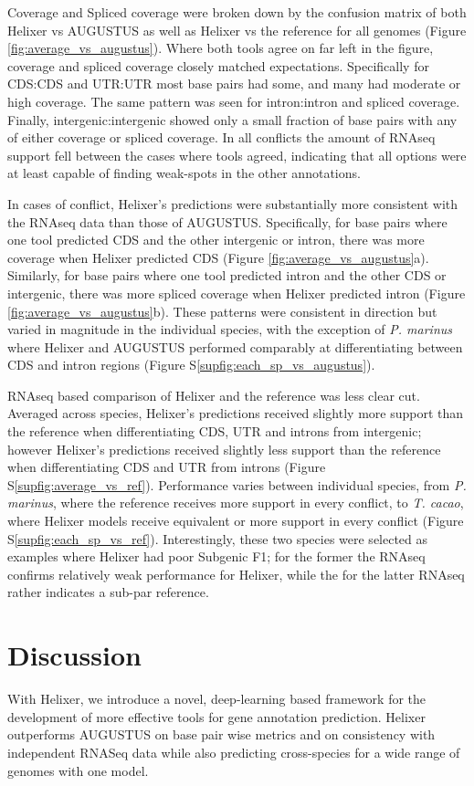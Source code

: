 \documentclass{bioinfo}
\newcounter{supfig}
\begin{document}
Coverage and Spliced coverage were broken down by the confusion matrix of both
Helixer vs AUGUSTUS as well as Helixer vs the reference for all genomes (Figure \ref{fig:average_vs_augustus}). 
Where both tools agree on far left in the figure, coverage and spliced coverage closely matched expectations. 
Specifically for CDS:CDS and UTR:UTR most base pairs had some, and many
had moderate or high coverage. The same pattern was seen for intron:intron and spliced
coverage. Finally, intergenic:intergenic showed only a small fraction of base pairs with 
any of either coverage or spliced coverage. In all conflicts the amount of RNAseq support
fell between the cases where tools agreed, indicating that all options were at least
capable of finding weak-spots in the other annotations.

In cases of conflict, Helixer's predictions were substantially more consistent with
the RNAseq data than those of AUGUSTUS. Specifically, for base pairs where one tool predicted CDS and
the other intergenic or intron, there was more coverage when 
Helixer predicted CDS (Figure \ref{fig:average_vs_augustus}a). 
Similarly, for base pairs where one tool predicted intron and the other 
CDS or intergenic, there was more spliced coverage when Helixer predicted intron (Figure \ref{fig:average_vs_augustus}b). 
These patterns were consistent in direction but varied in magnitude in the individual species,
with the exception of {\it P. marinus} where Helixer and AUGUSTUS performed comparably
at differentiating between CDS and intron regions (Figure S\ref{supfig:each_sp_vs_augustus}).

RNAseq based comparison of Helixer and the reference was less clear cut.
Averaged across species, Helixer's predictions received slightly more support
than the reference when differentiating CDS, UTR and introns from intergenic;
however Helixer's predictions received slightly less support than the reference 
when differentiating CDS and UTR from introns (Figure S\ref{supfig:average_vs_ref}). 
Performance varies between individual
species, from {\it P. marinus}, where the reference receives more support
in every conflict, to {\it T. cacao}, where Helixer models receive equivalent
or more support in every conflict (Figure S\ref{supfig:each_sp_vs_ref}). Interestingly, these two
species were selected as examples where Helixer had poor Subgenic F1; 
for the former the RNAseq confirms relatively weak performance for Helixer, while the 
for the latter RNAseq rather indicates a sub-par reference. 

\section{Discussion}
With Helixer, we introduce a novel, deep-learning based framework for the development 
of more effective tools for gene annotation prediction. 
Helixer outperforms AUGUSTUS on base pair wise metrics and on 
consistency with independent RNASeq data while also predicting cross-species for a wide range of  
genomes with one model. 
\end{document}
